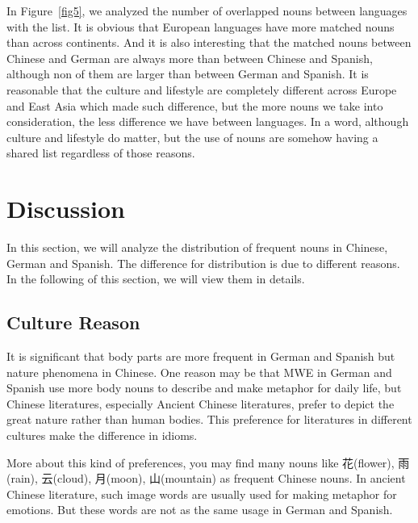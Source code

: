 In Figure~\ref{fig5}, we analyzed the number of overlapped nouns between languages with the list. It is obvious that European languages have more matched nouns than across continents. And it is also interesting that the matched nouns between Chinese and German are always more than between Chinese and Spanish, although non of them are larger than between German and Spanish. It is reasonable that the culture and lifestyle are completely different across Europe and East Asia which made such difference, but the more nouns we take into consideration, the less difference we have between languages. In a word, although culture and lifestyle do matter, but the use of nouns are somehow having a shared list regardless of those reasons. 




\section{Discussion}

In this section, we will analyze the distribution of frequent nouns in Chinese, German and Spanish. The difference for distribution is due to different reasons. In the following of this section, we will view them in details. 

\subsection{Culture Reason}
It is significant that body parts are more frequent in German and Spanish but nature phenomena in Chinese. One reason may be that MWE in German and Spanish use more body nouns to describe and make metaphor for daily life, but Chinese literatures, especially Ancient Chinese literatures, prefer to depict the great nature rather than human bodies. This preference for literatures in different cultures make the difference in idioms. 

More about this kind of preferences, you may find many nouns like 花(flower), 雨(rain), 云(cloud), 月(moon), 山(mountain) as frequent Chinese nouns. In ancient Chinese literature, such image words are usually used for making metaphor for emotions. But these words are not as the same usage in German and Spanish. 

